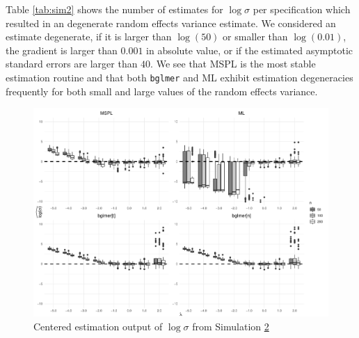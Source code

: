 \documentclass[11pt, a4paper]{article}
\theoremstyle{example} \newtheorem{example}{Example}[section]
\theoremstyle{theorem} \newtheorem{theorem}{Theorem}[section]
\theoremstyle{theorem }\newtheorem{proposition}{Proposition}[section]
\theoremstyle{theorem }\newtheorem{corollary}{Corollary}[section]
\begin{document}
Table \ref{tab:sim2} shows the number of estimates for $\log \sigma$ per specification which resulted in an degenerate random effects variance estimate. We considered an estimate degenerate, if it is larger than $\log(50)$ or smaller than $\log(0.01)$, the gradient is larger than $0.001$ in absolute value, or if the estimated asymptotic standard errors are larger than $40$. We see that MSPL is the most stable estimation routine and that both \texttt{bglmer} and ML exhibit estimation degeneracies frequently for both small and large values of the random effects variance. 
\begin{figure}[H]
	\begin{center}
		\includegraphics[width=\textwidth]{Figures/sim2.pdf}
	\end{center}
	\caption{Centered estimation output of $\log \sigma$ from Simulation \hyperref[sec:sim2]{2}}
	\label{fig:sim2}
\end{figure}
\end{document}
